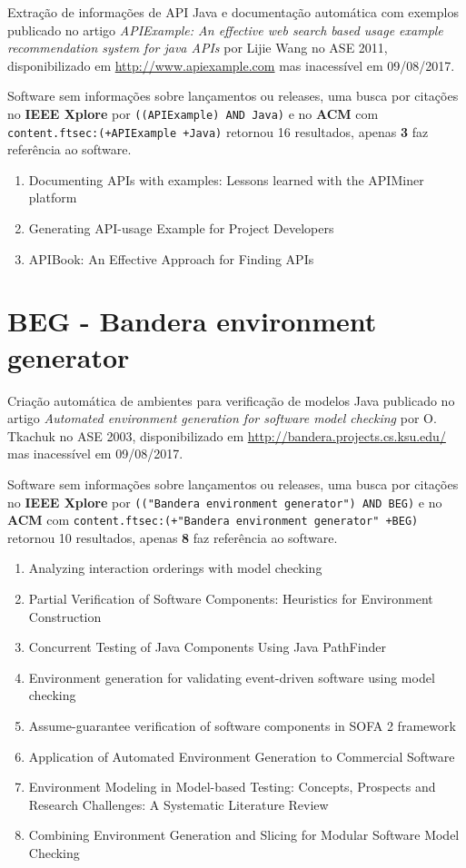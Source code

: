 Extração de informações de API Java e documentação automática com exemplos
publicado no artigo {\it APIExample: An effective web search based usage example recommendation system for java APIs}
por Lijie Wang
no ASE 2011,
disponibilizado em \url{http://www.apiexample.com}
mas inacessível em 09/08/2017.

Software sem informações sobre lançamentos ou releases,
uma busca por citações no {\bf IEEE Xplore} por
\texttt{((APIExample) AND Java)}
e no {\bf ACM} com
\texttt{content.ftsec:(+APIExample +Java)}
retornou
16 resultados, apenas
{\bf 3} faz referência ao software.

\begin{enumerate}
\item Documenting APIs with examples: Lessons learned with the APIMiner platform
\item Generating API-usage Example for Project Developers
\item APIBook: An Effective Approach for Finding APIs
\end{enumerate}


\section{BEG - Bandera environment generator}

Criação automática de ambientes para verificação de modelos Java
publicado no artigo {\it Automated environment generation for software model checking}
por O. Tkachuk
no ASE 2003,
disponibilizado em \url{http://bandera.projects.cs.ksu.edu/}
mas inacessível em 09/08/2017.

Software sem informações sobre lançamentos ou releases,
uma busca por citações no {\bf IEEE Xplore} por
\texttt{(("Bandera environment generator") AND BEG)}
e no {\bf ACM} com
\texttt{content.ftsec:(+"Bandera environment generator" +BEG)}
retornou
10 resultados, apenas
{\bf 8} faz referência ao software.

\begin{enumerate}
\item Analyzing interaction orderings with model checking
\item Partial Verification of Software Components: Heuristics for Environment Construction
\item Concurrent Testing of Java Components Using Java PathFinder
\item Environment generation for validating event-driven software using model checking
\item Assume-guarantee verification of software components in SOFA 2 framework
\item Application of Automated Environment Generation to Commercial Software
\item Environment Modeling in Model-based Testing: Concepts, Prospects and Research Challenges: A Systematic Literature Review
\item Combining Environment Generation and Slicing for Modular Software Model Checking
\end{enumerate}


